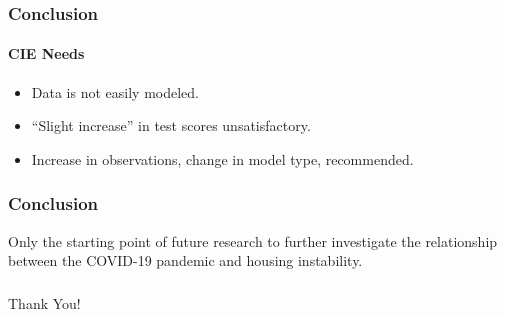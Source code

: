 \documentclass{beamer} %
\begin{document}
\begin{frame}
\frametitle{Conclusion}
\framesubtitle{CIE Needs}

\begin{itemize}
	\item Data is not easily modeled.
	\item “Slight increase” in test scores unsatisfactory.
	\item Increase in observations, change in model type, recommended.
\end{itemize}

\end{frame}

\begin{frame}
\frametitle{Conclusion}
Only the starting point of future research to further investigate the relationship between the COVID-19 pandemic and housing instability.

\end{frame}



\begin{frame}
\frametitle{}
\centering
\Huge Thank You!
\end{frame}
\end{document}
